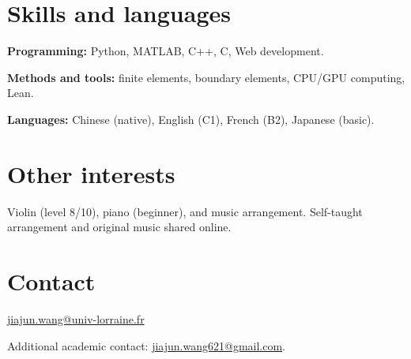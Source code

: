 \documentclass[10pt,a4paper]{article}
\begin{document}
\section{Skills and languages}
\textbf{Programming:} Python, MATLAB, C++, C, Web development.\par
\textbf{Methods and tools:} finite elements, boundary elements, CPU/GPU computing, Lean.\par
\textbf{Languages:} Chinese (native), English (C1), French (B2), Japanese (basic).

\section{Other interests}
Violin (level 8/10), piano (beginner), and music arrangement. Self-taught arrangement and original music shared online.

\section{Contact}
\href{mailto:jiajun.wang@univ-lorraine.fr}{jiajun.wang@univ-lorraine.fr}\par
Additional academic contact: \href{mailto:jiajun.wang621@gmail.com}{jiajun.wang621@gmail.com}.
\end{document}
